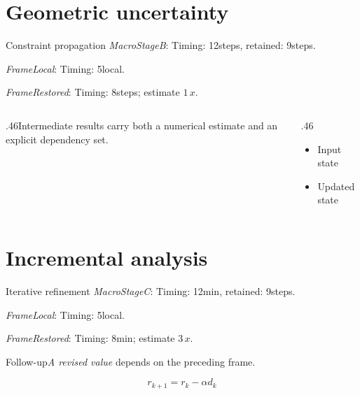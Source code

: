 \documentclass[11pt,aspectratio=43]{beamer}
\newcommand{\fuzzlayerA}[1]{\textit{#1}}
\newcommand{\fuzzterm}[1]{\fuzzlayerA{#1}}
\newcommand{\fuzzpair}[2]{\fuzzterm{#1}: #2}
\newcommand{\fuzzunit}{steps}
\let\fuzzoriginalunit\fuzzunit
\newcommand{\fuzzcoefficient}{1}
\newcommand{\fuzzscale}[2][\fuzzcoefficient]{#1\,#2}
\begin{document}
\section{Geometric uncertainty}
\begin{frame}[t]{Constraint propagation}
\fuzzpair{MacroStageB}{Timing: 12\fuzzunit, retained: 9\fuzzoriginalunit.}\par
{\renewcommand{\fuzzunit}{local}\fuzzpair{FrameLocal}{Timing: 5\fuzzunit.}\par}
\fuzzpair{FrameRestored}{Timing: 8\fuzzunit; estimate $\fuzzscale{x}$.}\par
\begin{columns}[T]\begin{column}{.46\textwidth}Intermediate results carry both a numerical estimate and an explicit dependency set.\end{column}\begin{column}{.46\textwidth}\begin{itemize}\item Input state\item Updated state\end{itemize}\end{column}\end{columns}
\end{frame}
\renewcommand{\fuzzunit}{min}
\renewcommand{\fuzzcoefficient}{3}
\renewcommand{\fuzzterm}[1]{{\textit{#1}}}
\section{Incremental analysis}
\begin{frame}[t]{Iterative refinement}
\fuzzpair{MacroStageC}{Timing: 12\fuzzunit, retained: 9\fuzzoriginalunit.}\par
{\renewcommand{\fuzzunit}{local}\fuzzpair{FrameLocal}{Timing: 5\fuzzunit.}\par}
\fuzzpair{FrameRestored}{Timing: 8\fuzzunit; estimate $\fuzzscale{x}$.}\par
\begin{block}{Follow-up}\fuzzterm{A revised value} depends on the preceding frame.\end{block}
\[r_{k+1}=r_k-\alpha d_k\]
\end{frame}
\renewcommand{\fuzzunit}{us}
\renewcommand{\fuzzcoefficient}{4}
\renewcommand{\fuzzterm}[1]{{\textrm{#1}}}
\end{document}
